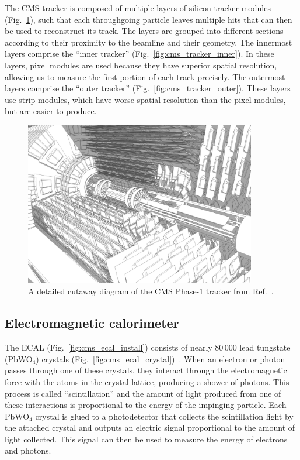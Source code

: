 The CMS tracker is composed of multiple layers of silicon tracker modules (Fig.~\ref{fig:cms_tracker_layout}), such that each throughgoing particle leaves multiple hits that can then be used to reconstruct its track. 
The layers are grouped into different sections according to their proximity to the beamline and their geometry. 
The innermost layers comprise the ``inner tracker'' (Fig.~\ref{fig:cms_tracker_inner}). 
In these layers, pixel modules are used because they have superior spatial resolution, allowing us to measure the first portion of each track precisely. 
The outermost layers comprise the ``outer tracker'' (Fig.~\ref{fig:cms_tracker_outer}). 
These layers use strip modules, which have worse spatial resolution than the pixel modules, but are easier to produce. 

\begin{figure}[htb]
    \centering
    \includegraphics[width=0.9\textwidth,valign=c]{fig/cms/tracker_detailed.png}
    \caption[A detailed cutaway diagram of the CMS Phase-1 tracker.]{
        A detailed cutaway diagram of the CMS Phase-1 tracker from Ref.~\cite{Sakuma:2630160}. 
    }
    \label{fig:cms_tracker_layout}
\end{figure}

\subsection{Electromagnetic calorimeter}
The ECAL (Fig.~\ref{fig:cms_ecal_install}) consists of nearly 80\,000 lead tungstate (PbWO$_4$) crystals\footnotemark{} (Fig.~\ref{fig:cms_ecal_crystal})~\cite{CMSWebECAL}. 
When an electron or photon passes through one of these crystals, they interact through the electromagnetic force with the atoms in the crystal lattice, producing a shower of photons. 
This process is called ``scintillation'' and the amount of light produced from one of these interactions is proportional to the energy of the impinging particle. 
Each PbWO$_4$ crystal is glued to a photodetector that collects the scintillation light by the attached crystal and outputs an electric signal proportional to the amount of light collected. 
This signal can then be used to measure the energy of electrons and photons. 

